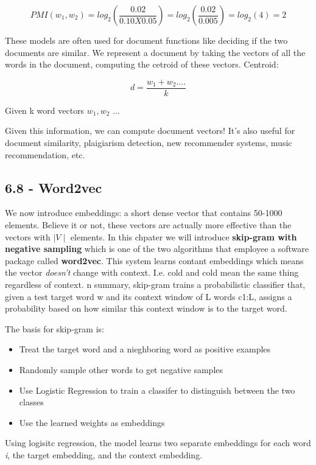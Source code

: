 \documentclass{article}
\begin{document}
\[
    PMI(w_1,w_2) = log_2(\frac{0.02}{0.10 X 0.05}) = log_2(\frac{0.02}{0.005}) = log_2(4) = 2
\]

These models are often used for document functions like deciding if the two documents are similar. We represent a document by taking the vectors of all the words in the document,
computing the cetroid of these vectors. \newline
Centroid:

\[
    d = \frac{w_1 + w_2....}{k}
\]

Given k word vectors $w_1, w_2$ ... \newline

Given this information, we can compute document vectors! It's also useful for document similarity, plaigiarism detection, new recommender systems, music recommendation, etc.

\subsection{6.8 - Word2vec}

We now introduce embeddings: a short dense vector that contains 50-1000 elements. Believe it or not, these vectors are actually
more effective than the vectors with $\mid V \mid$ elements.\newline
In this chpater we will introduce \textbf{skip-gram with negative sampling} which is one of the two algorithms that employee a software package called \textbf{word2vec}.
This system learns contant embeddings which means the vector \textit{doesn't} change with context. I.e. cold and cold mean the same thing regardless of context.
n summary, skip-gram trains a probabilistic classifier that, given a test target word
w and its context window of L words c1:L, assigns a probability based on how similar
this context window is to the target word.

The basis for skip-gram is:

\begin{itemize}
    \item Treat the target word and a nieghboring word as positive examples
    \item Randomly sample other words to get negative samples
    \item Use Logistic Regression to train a classifer to distinguish between the two classes
    \item Use the learned weights as embeddings
\end{itemize}

Using logisitc regression, the model learns two separate embeddings for each word \textit{i}, the target embedding, and the context embedding.
\end{document}
